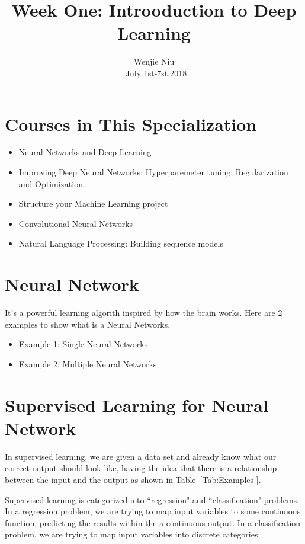 \documentclass[10pt,twocolumn,letterpaper]{article}
\begin{document}
\title{Week One: Introoduction to Deep Learning}
\author{Wenjie Niu\\\ July 1st-7st,2018}


\maketitle
\section{Courses in This Specialization}
\begin{itemize}
\item Neural Networks and  Deep Learning
\item Improving Deep Neural Networks: Hyperparemeter tuning, Regularization and Optimization.
\item Structure your Machine Learning project
\item Convolutional Neural Networks
\item Natural Language Processing: Building sequence models
\end{itemize}

\section{Neural Network}
It's a powerful learning algorith inspired by how the brain works. Here are 2 examples to show what is a Neural Networks.
\begin{itemize}
\item Example 1: Single Neural Networks
\item Example 2: Multiple Neural Networks
\end{itemize}

\section{Supervised Learning for Neural Network}
In supervised learning, we are given a data set and already know what our correct output should look like, having the idea that there is a relationship between the input and the output as shown in Table~\ref{Tab:Examples }.\par
Supervised learning is categorized into ``regression" and ``classification" problems. In a regression problem, we are trying to map input variables to some continuous function, predicting the results within the a continuous output. In a classification problem, we are trying to map input variables into discrete categories.\par
\end{document}

